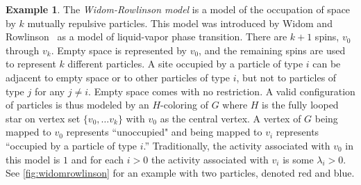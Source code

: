 \documentclass[11pt]{article}
\theoremstyle{definition}
\newtheorem{example}[theorem]{Example}
\begin{document}
\begin{example}
The {\it Widom-Rowlinson model} is a model of the occupation of space by $k$ mutually repulsive particles. This model was introduced by Widom and Rowlinson~\cite{WidomRowlinson1970} as a model of liquid-vapor phase transition. There are $k+1$ spins, $v_0$ through $v_k$. Empty space is represented by $v_0$, and the remaining spins are used to represent $k$ different particles. A site occupied by a particle of type $i$ can be adjacent to empty space or to other particles of type $i$, but not to particles of type $j$ for any $j \ne i$. Empty space comes with no restriction. A valid configuration of particles is thus modeled by an $H$-coloring of $G$ where $H$ is the fully looped star on vertex set $\{v_0, \ldots v_k\}$ with $v_0$ as the central vertex. A vertex of $G$ being mapped to $v_0$ represents ``unoccupied" and being mapped to $v_i$ represents ``occupied by a particle of type $i$.'' Traditionally, the activity associated with $v_0$ in this model is $1$ and for each $i > 0$ the activity associated with $v_i$ is some $\lambda_i > 0$. See \cref{fig:widomrowlinson} for an example with two particles, denoted red and blue.  
\end{example}
\end{document}
